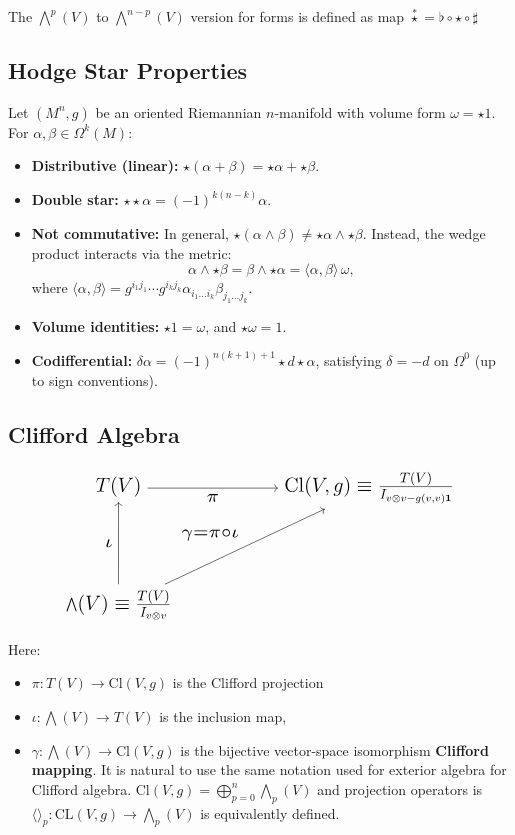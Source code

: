 \documentclass[12pt]{article}
\begin{document}
The $\bigwedge^p(V)$ to $\bigwedge^{n-p}(V)$ version for forms is defined as map $\overset{*}{\star} = \flat \circ \star \circ \sharp$

\subsection*{Hodge Star Properties}
Let \((M^n, g)\) be an oriented Riemannian \(n\)-manifold with volume form \(\omega = \star 1\). For \(\alpha, \beta \in \Omega^k(M)\):

\begin{itemize}
	\item \textbf{Distributive (linear):} \(\star(\alpha + \beta) = \star\alpha + \star\beta\).
	\item \textbf{Double star:} \(\star\star\alpha = (-1)^{k(n-k)} \alpha\).
	\item \textbf{Not commutative:} In general, \(\star(\alpha \wedge \beta) \neq \star\alpha \wedge \star\beta\). Instead, the wedge product interacts via the metric:
	\[
	\alpha \wedge \star\beta = \beta \wedge \star\alpha = \langle \alpha, \beta \rangle \, \omega,
	\]
	where \(\langle \alpha, \beta \rangle = g^{i_1j_1}\cdots g^{i_kj_k} \alpha_{i_1\dots i_k}\beta_{j_1\dots j_k}\).
	\item \textbf{Volume identities:} \(\star 1 = \omega\), and \(\star \omega = 1\).
	\item \textbf{Codifferential:} \(\delta\alpha = (-1)^{n(k+1)+1} \star d \star \alpha\), satisfying \(\delta = -d\) on \(\Omega^0\) (up to sign conventions).
\end{itemize}


\subsection{Clifford Algebra}


$$
\begin{tikzcd}[scale=1.8, transform shape, column sep=large, row sep=large, cells={nodes={font=\Large}}]
	T(V) \arrow[rr, "\pi"']  & &  \mathrm{Cl}(V,g) \equiv \frac{T(V)}{I_{v\otimes v - g(v,v)\mathbf{1}}} \\
	& & \\
	\bigwedge(V) \equiv \frac{T(V)}{I_{v\otimes v}} \arrow[uu, "\iota"] \arrow[uurr, "\gamma= \pi \circ \iota"] &  &
\end{tikzcd}
$$

Here:
\begin{itemize}
	\item \(\pi: T(V) \to \mathrm{Cl}(V,g)\) is the Clifford projection
	\item \(\iota: \bigwedge(V) \to  T(V) \)  is the inclusion map,
	\item \(\gamma: \bigwedge(V) \rightarrow \mathrm{Cl}(V,g)\) is the bijective vector-space isomorphism \textbf{Clifford mapping}. It is natural to use the same notation used for exterior algebra for Clifford algebra. $\mathrm{Cl}(V, g) = \bigoplus^{n}_{p=0}\bigwedge_p(V)$ and projection operators is $\langle\rangle_p: \mathrm{CL}(V, g) \to \bigwedge_p (V)$ is equivalently defined.
\end{itemize}
\end{document}
